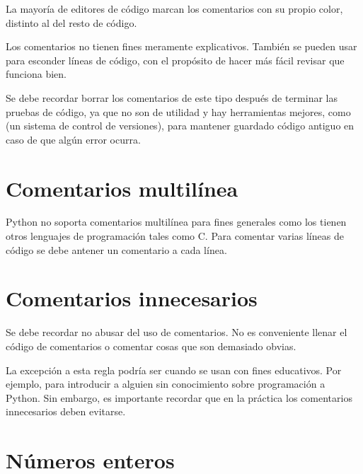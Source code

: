 La mayoría de editores de código marcan los comentarios con su propio color, distinto al del resto de código.


Los comentarios no tienen fines meramente explicativos.
También se pueden usar para esconder líneas de código, con el propósito de hacer más fácil revisar que funciona bien.


Se debe recordar borrar los comentarios de este tipo después de terminar las pruebas de código, ya que no son de utilidad y hay herramientas mejores, como  (un sistema de control de versiones), para mantener guardado código antiguo en caso de que algún error ocurra.

\section{Comentarios multilínea}

Python no soporta comentarios multilínea para fines generales como los tienen otros lenguajes de programación tales como C.
Para comentar varias líneas de código se debe antener un comentario a cada línea.


\section{Comentarios innecesarios}

Se debe recordar no abusar del uso de comentarios.
No es conveniente llenar el código de comentarios o comentar cosas que son demasiado obvias.


La excepción a esta regla podría ser cuando se usan con fines educativos.
Por ejemplo, para introducir a alguien sin conocimiento sobre programación a Python.
Sin embargo, es importante recordar que en la práctica los comentarios innecesarios deben evitarse.

\section{Números enteros}

